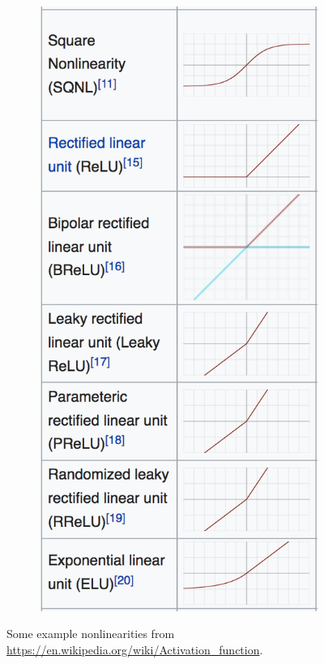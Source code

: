 \documentclass[10pt,mathserif]{beamer}
\begin{document}
\begin{frame}
\begin{figure}[ht]
\begin{subfigure}{.16\paperwidth}
      \centering
      \includegraphics[width=0.16\paperwidth]{figure/activation_examples_2}
    \end{subfigure}
  \caption{\label{fig:activations} Some example nonlinearities from
    \url{https://en.wikipedia.org/wiki/Activation_function}. }
\end{figure}
\end{frame}
\end{document}
